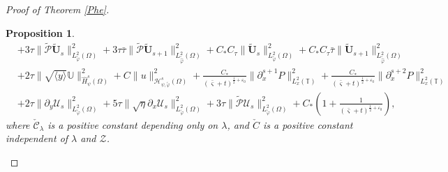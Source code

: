 \documentclass{amsart}
\numberwithin{equation}{section}
\newtheorem{prop}{Proposition}[section]
\newcommand\y{{{\langle y \rangle}}}
\begin{document}
\begin{proof}[Proof of Theorem \ref{Phe}]
\begin{prop}
\begin{align}
    &+3\tau\|\tilde{\mathcal{P}}\tilde{\mathbf{U}}_{s}\|_{L_{\tilde{\varphi}}^{2}(\Omega)}^{2}
     +3\tau\bar{\tau}\|\tilde{\mathcal{P}}\tilde{\mathbf{U}}_{s+1}\|_{L_{\tilde{\hat{\varphi}}}^{2}(\Omega)}^{2}
     +C_{*}C_{\tau}\|\tilde{\mathbf{U}}_{s}\|_{L_{\tilde{\varphi}}^{2}(\Omega)}^{2}
     +C_{*}C_{\tau}\bar{\tau}\|\tilde{\mathbf{U}}_{s+1}\|_{L_{\tilde{\hat{\varphi}}}^{2}(\Omega)}^{2}\nonumber\\
    &+2\tau\|\sqrt{\y}\mathbb{U}\|_{\hat{H}_{\psi}^{s}(\Omega)}^{2}
     +C\|u\|_{\mathcal{H}_{\psi,\tilde{\varphi}}^{s}(\Omega)}^{2}
     +\frac{C_{*}}{(\bar{\varsigma}+t)^{\frac{1}{2}+\varepsilon_{0}}}\|\partial_{x}^{s+1}P\|_{L_{x}^{2}(\mathbb{T})}^{2}
     +\frac{C_{*}}{(\bar{\varsigma}+t)^{\frac{1}{2}+\varepsilon_{0}}}\|\partial_{x}^{s+2}P\|_{L_{x}^{2}(\mathbb{T})}^{2}\nonumber\\
    &+2\tau\|\partial_{y}\mathcal{U}_{s}\|_{L_{\tilde{\varphi}}^{2}(\Omega)}^{2}
     +5\tau\|\sqrt{\eta}\partial_{x}\mathcal{U}_{s}\|_{L_{\tilde{\varphi}}^{2}(\Omega)}^{2}
     +3\tau\|\tilde{\mathcal{P}}\mathcal{U}_{s}\|_{L_{\tilde{\varphi}}^{2}(\Omega)}^{2}
     +C_{*}\left(1+\frac{1}{(\bar{\varsigma}+t)^{\frac{1}{2}+\varepsilon_{0}}}\right),\nonumber
\end{align}
where $\check{\mathcal{C}}_{\lambda}$ is a positive constant depending only on $\lambda$, and $\check{C}$ is a positive constant independent of $\lambda$ and $\mathcal{Z}$.
\end{prop}


\end{proof}
\end{document}
